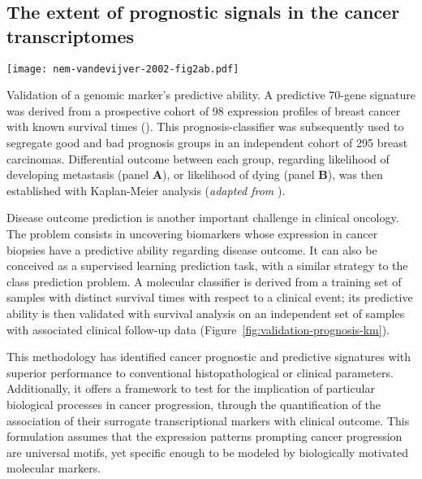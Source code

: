 \subsection{The extent of prognostic signals in the cancer transcriptomes}
\label{sec:discussion-prognostic-microarrays}

\begin{marginfigure}%
  \texttt{[image: nem-vandevijver-2002-fig2ab.pdf]}
  \caption[Validation of a genomic marker's predictive ability]{Validation of a
    genomic marker's predictive ability.  A predictive 70-gene signature was
    derived from a prospective cohort of 98 expression profiles of breast cancer
    with known survival times (\citealp{vant_veer_gene_2002}).  This
    prognosis-classifier was subsequently used to segregate good and bad
    prognosis groups in an independent cohort of 295 breast
    carcinomas. Differential outcome between each group, regarding likelihood of
    developing metastasis (panel \textbf{A}), or likelihood of dying (panel
    \textbf{B}), was then established with Kaplan-Meier analysis (\emph{adapted
      from} \citealp{van_de_vijver_gene-expression_2002}).}
  \label{fig:validation-prognosis-km}%
\end{marginfigure}

Disease outcome prediction is another important challenge in clinical
oncology.\cite{van_de_vijver_gene-expression_2002,vasselli_predicting_2003,sanchez-carbayo_defining_2006}
The problem consists in uncovering biomarkers whose expression in cancer
biopsies have a predictive ability regarding disease outcome.  It can also be
conceived as a supervised learning prediction task, with a similar strategy to
the class prediction problem.  A molecular classifier is derived from a training
set of samples with distinct survival times with respect to a clinical event;
its predictive ability is then validated with survival analysis on an
independent set of samples with associated clinical follow-up data
(Figure~\ref{fig:validation-prognosis-km}).

This methodology has identified cancer prognostic and predictive signatures with
superior performance to conventional histopathological or clinical
parameters.\cite{sole_biological_2009} Additionally, it offers a framework to
test for the implication of particular biological processes in cancer
progression, through the quantification of the association of their surrogate
transcriptional markers with clinical outcome.\cite{chang_gene_2004} This
formulation assumes that the expression patterns prompting cancer progression
are universal motifs, yet specific enough to be modeled by biologically
motivated molecular markers.

